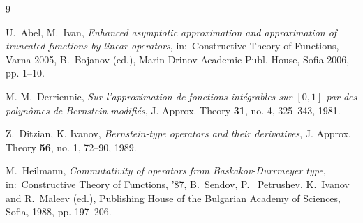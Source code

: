 \documentclass[12pt,reqno]{article}
\begin{document}
\begin{thebibliography}{9}

 U.~Abel, M.~Ivan, \newblock%
\textit{Enhanced asymptotic approximation and approximation of truncated
functions by linear operators}, \newblock in:\ Constructive Theory of
Functions, Varna 2005, B.~Bojanov (ed.), \newblock Marin Drinov Academic
Publ. House, Sofia 2006, pp. 1--10.

%
%
%

 {M.-M.~Derriennic, } \textit{Sur l'approximation de
fonctions int\'{e}grables sur $[0,1] $ par des polyn\^{o}mes de Bernstein
modifi\'{e}s}, J. Approx. Theory \textbf{31}, no. 4, 325--343, 1981.

 {Z.~Ditzian, } {K. Ivanov}, \textit{Bernstein-type
operators and their derivatives}, J. Approx. Theory \textbf{56}, no. 1,
72--90, 1989.

%

 M.~Heilmann, \newblock \textit{Commutativity of operators from
Baskakov-Durrmeyer type}, \newblock in:\ Constructive Theory of Functions,
'87, B.~Sendov, P.~ Petrushev, K.~Ivanov and R.~Maleev (ed.), \newblock %
Publishing House of the Bulgarian Academy of Sciences, Sofia, 1988, pp.
197--206.
%
%


\end{thebibliography}
\end{document}
